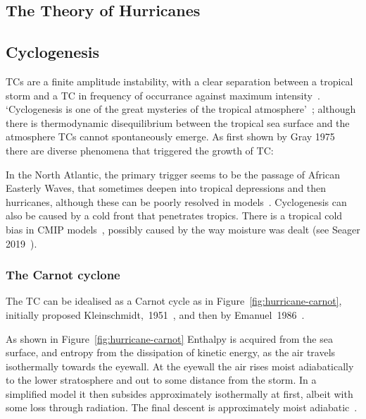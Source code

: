
\subsection{The Theory of Hurricanes}
\label{sec:hurr-theory}

\subsection{Cyclogenesis}
\label{sec:cyclogenesis}
TCs are a finite amplitude instability, with
a clear separation between a tropical storm and a TC
in frequency of occurrance against maximum intensity~\cite{emanuel2005divine}.
`Cyclogenesis is one of the great mysteries of the tropical atmosphere'~\cite{emanuel2018progress};
although there is thermodynamic disequilibrium between the tropical sea
surface and the atmosphere TCs cannot spontaneously emerge. As first shown by
Gray 1975~\cite{gray1975tropical} there are
 diverse phenomena that triggered the growth of TC:

 In the North Atlantic, the primary trigger seems to be the passage of African Easterly Waves,
 that sometimes deepen into tropical depressions and then hurricanes,
 although these can be poorly resolved in models~\cite{tomassini2017interaction}.
 Cyclogenesis can also be caused by a cold front that penetrates tropics.
 There is a tropical cold bias in CMIP models~\cite{camargo2013global},
 possibly caused by the way moisture was dealt (see Seager 2019~\cite{seager2019strengthening}).

\subsubsection{The Carnot cyclone}
\label{sec:carnot}

The TC can be idealised as a Carnot cycle as in Figure~\ref{fig:hurricane-carnot},
initially proposed Kleinschmidt,~1951~\cite{kleinschmidt1951grundlagen},
and then by Emanuel~1986~\cite{emanuel1986air, emanuel1987dependence, lilly1985steady,}.



As shown in Figure~\ref{fig:hurricane-carnot} Enthalpy is acquired from the sea surface,
and entropy from the dissipation of kinetic energy,
 as the air travels isothermally towards the eyewall.
 At the eyewall the air rises moist adiabatically
 to the lower stratosphere and out to some distance from the storm.
 In a simplified model it then subsides
 approximately isothermally at first, albeit with some loss through radiation.
 The final descent is approximately moist adiabatic~\cite{emanuel2018progress}.

